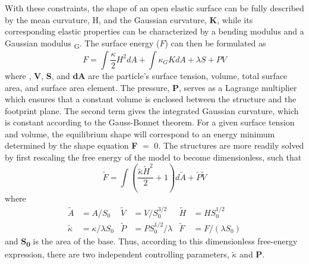 With these constraints, the shape of an open elastic surface can be fully described by the mean curvature, H, and the Gaussian curvature, \textbf{K}, while its corresponding elastic properties can be characterized by a bending modulus \textkappa and a Gaussian modulus \textkappa\textsubscript{G}.
The surface energy (\(F\)) can then be formulated as
\begin{equation}
 F = \int \frac{\kappa}{2}H^2 dA + \int \kappa_G K dA + \lambda S + PV \label{nanogold:eqn1}
\end{equation}
where \textlambda, \textbf{V}, \textbf{S}, and \textbf{dA} are the particle's surface tension, volume, total surface area, and surface area element\cite{RefWorks:49,RefWorks:97}.
The pressure, \textbf{P}, serves as a Lagrange multiplier which ensures that a constant volume is enclosed between the structure and the footprint plane.
The second term gives the integrated Gaussian curvature, which is constant according to the Gauss-Bonnet theorem\cite{RefWorks:98}.
For a given surface tension and volume, the equilibrium shape will correspond to an energy minimum determined by the shape equation \textdelta{} \textbf{F} \(=\) 0.
The structures are more readily solved by first rescaling the free energy of the model to become dimensionless, such that
\begin{equation}
 \tilde{F} = \int \left (\frac{\tilde{\kappa} \tilde{H}^2}{2} + 1 \right)d \tilde{A} + \tilde{P} \tilde{V} \label{nanogold:eqn2}
\end{equation}
where
\begin{align*}
 \tilde{A} &%
 = A/S_0 & \tilde{V} &%
 = V/S^{3/2}_0 &
 \tilde{H} &%
 = H S^{1/2}_0 \\
 \tilde{\kappa} &%
 = \kappa / \lambda S_0 &
 \tilde{P} &%
 = P S^{1/2}_0 / \lambda &
 \tilde{F} &%
 = F / (\lambda S_0)
\end{align*}
and \textbf{S\textsubscript{0}} is the area of the base.
Thus, according to this dimensionless free-energy expression, there are two independent controlling parameters, \(\tilde{\kappa}\) and \textbf{P}.

